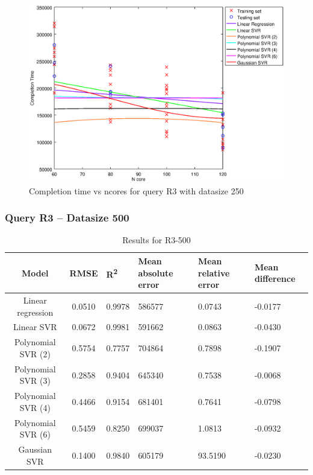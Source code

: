 \documentclass[a4paper,11pt]{article}
\begin{document}
\begin {figure}[hbtp]
\centering
\includegraphics[width=\textwidth]{output/R3_250_LINEAR_NCORE/plot_R3_250.eps}
\caption{Completion time vs ncores for query R3 with datasize 250}
\label{fig:all_linear_R3_250}
\end {figure}

\newpage
\subsubsection{Query R3 -- Datasize 500}
\begin{table}[H]
	\centering
	\begin{adjustbox}{center}
		\begin{tabular}{c | c M{1.2cm} M{2.5cm} M{2.5cm} M{1.8cm}}
			Model & RMSE & R\textsuperscript{2} & Mean absolute error & Mean relative error & Mean difference \tabularnewline
			\hline
			Linear regression & 0.0510 & 0.9978 & 586577 & 0.0743 & -0.0177 \\
			Linear SVR & 0.0672 & 0.9981 & 591662 & 0.0863 & -0.0430 \\
			Polynomial SVR (2) & 0.5754 & 0.7757 & 704864 & 0.7898 & -0.1907 \\
			Polynomial SVR (3) & 0.2858 & 0.9404 & 645340 & 0.7538 & -0.0068 \\
			Polynomial SVR (4) & 0.4466 & 0.9154 & 681401 & 0.7641 & -0.0798 \\
			Polynomial SVR (6) & 0.5459 & 0.8250 & 699037 & 1.0813 & -0.0932 \\
			Gaussian SVR & 0.1400 & 0.9840 & 605179 & 93.5190 & -0.0230 \\
		\end{tabular}
	\end{adjustbox}
	\\
	\caption{Results for R3-500}
	\label{fig:all_linear_R3_500}
\end{table}
\end{document}
